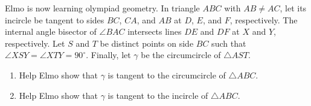 Elmo is now learning olympiad geometry. In triangle $ABC$ with $AB\neq AC$, let its incircle be tangent to sides $BC$, $CA$, and $AB$ at $D$, $E$, and $F$, respectively. The internal angle bisector of $\angle BAC$ intersects lines $DE$ and $DF$ at $X$ and $Y$, respectively. Let $S$ and $T$ be distinct points on side $BC$ such that $\angle XSY=\angle XTY=90^\circ$. Finally, let $\gamma$ be the circumcircle of $\triangle AST$.
\begin{enumerate}[label=(\alph*)]
	\item Help Elmo show that $\gamma$ is tangent to the circumcircle of $\triangle ABC$.
	\item Help Elmo show that $\gamma$ is tangent to the incircle of $\triangle ABC$.
\end{enumerate}